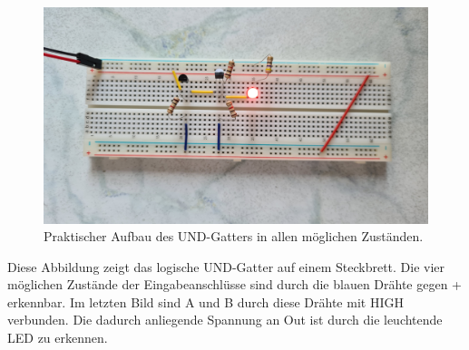 \begin{figure}[h!]
\begin{minipage}{.5\textwidth}
	\end{minipage}%
	\begin{minipage}{.5\textwidth}
		\centering
		\includegraphics[scale=.05]{./Fotos/UND-11.jpg}
	\end{minipage}
	\caption{Praktischer Aufbau des UND-Gatters in allen möglichen Zuständen.}
\end{figure}
\newpage
Diese Abbildung zeigt das logische UND-Gatter auf einem Steckbrett. Die vier möglichen Zustände der Eingabeanschlüsse sind durch die blauen Drähte gegen \glqq{}+\grqq{} erkennbar. Im letzten Bild sind A und B durch diese Drähte mit HIGH verbunden. Die dadurch anliegende Spannung an Out ist durch die leuchtende LED zu erkennen.
